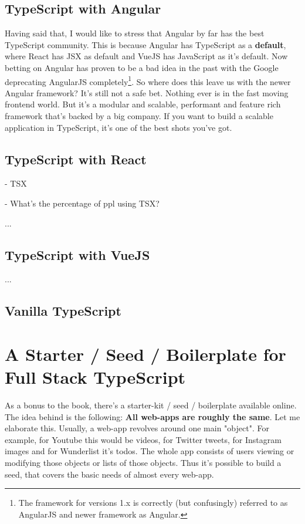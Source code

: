 \documentclass[12pt,a4paper]{report}
\begin{document}
\section{TypeScript with Angular}

Having said that, I would like to stress that Angular by far has the best TypeScript community. This is because Angular has TypeScript as a \textbf{default}, where React has JSX as default and VueJS has JavaScript as it's default. Now betting on Angular has proven to be a bad idea in the past with the Google deprecating AngularJS completely\footnote{The framework for versions 1.x is correctly (but confusingly) referred to as AngularJS and newer framework as Angular.}. So where does this leave us with the newer Angular framework? It's still not a safe bet. Nothing ever is in the fast moving frontend world. But it's  a modular and scalable, performant and feature rich framework that's backed by a big company. If you want to build a scalable application in TypeScript, it's one of the best shots you've got.


\section{TypeScript with React}

- TSX

- What's the percentage of ppl using TSX?

...


\section{TypeScript with VueJS}

...

\section{Vanilla TypeScript}


\chapter{A Starter / Seed / Boilerplate for Full Stack TypeScript}

As a bonus to the book, there's a starter-kit / seed / boilerplate available online. The idea behind is the following: \textbf{All web-apps are roughly the same}. Let me elaborate this. Usually, a web-app revolves around one main "object". For example, for Youtube this would be videos, for Twitter tweets, for Instagram images and for Wunderlist it's todos. The whole app consists of users viewing or modifying those objects or lists of those objects. Thus it's possible to build a seed, that covers the basic needs of almost every web-app.
\end{document}
